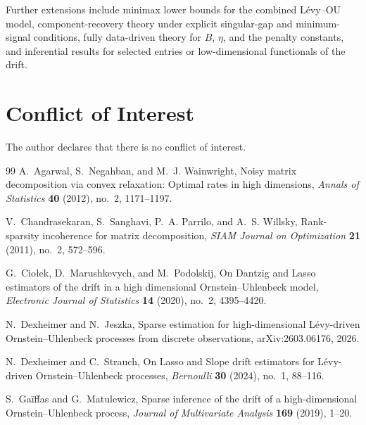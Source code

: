 \documentclass[12pt]{article}
\theoremstyle{definition}
\begin{document}
	Further extensions include minimax lower bounds for the combined L\'evy--OU model, component-recovery theory under explicit singular-gap and minimum-signal conditions, fully data-driven theory for $B$, $\eta$, and the penalty constants, and inferential results for selected entries or low-dimensional functionals of the drift.
	
	\section*{Conflict of Interest}
	The author declares that there is no conflict of interest.
	
	\begin{thebibliography}{99}
		A.~Agarwal, S.~Negahban, and M.~J. Wainwright,
		\newblock Noisy matrix decomposition via convex relaxation: Optimal rates in high dimensions,
		\newblock \emph{Annals of Statistics} \textbf{40} (2012), no.~2, 1171--1197.
		
		V.~Chandrasekaran, S.~Sanghavi, P.~A. Parrilo, and A.~S. Willsky,
		\newblock Rank-sparsity incoherence for matrix decomposition,
		\newblock \emph{SIAM Journal on Optimization} \textbf{21} (2011), no.~2, 572--596.
		
		G.~Cio{\l}ek, D.~Marushkevych, and M.~Podolskij,
		\newblock On Dantzig and Lasso estimators of the drift in a high dimensional Ornstein--Uhlenbeck model,
		\newblock \emph{Electronic Journal of Statistics} \textbf{14} (2020), no.~2, 4395--4420.
		
		N.~Dexheimer and N.~Jeszka,
		\newblock Sparse estimation for high-dimensional L\'evy-driven Ornstein--Uhlenbeck processes from discrete observations,
		\newblock arXiv:2603.06176, 2026.
		
		N.~Dexheimer and C.~Strauch,
		\newblock On Lasso and Slope drift estimators for L\'evy-driven Ornstein--Uhlenbeck processes,
		\newblock \emph{Bernoulli} \textbf{30} (2024), no.~1, 88--116.
		
		S.~Ga\"iffas and G.~Matulewicz,
		\newblock Sparse inference of the drift of a high-dimensional Ornstein--Uhlenbeck process,
		\newblock \emph{Journal of Multivariate Analysis} \textbf{169} (2019), 1--20.
		

\end{thebibliography}
\end{document}
